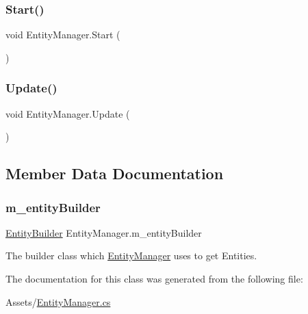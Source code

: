 \subsubsection{\texorpdfstring{Start()}{Start()}}
{\footnotesize\ttfamily void Entity\+Manager.\+Start (\begin{DoxyParamCaption}{ }\end{DoxyParamCaption})\hspace{0.3cm}{\ttfamily [private]}}

\mbox{\label{class_entity_manager_a842b748cc70c7e1366a57df0475b5b96}} 
\subsubsection{\texorpdfstring{Update()}{Update()}}
{\footnotesize\ttfamily void Entity\+Manager.\+Update (\begin{DoxyParamCaption}{ }\end{DoxyParamCaption})\hspace{0.3cm}{\ttfamily [private]}}



\subsection{Member Data Documentation}
\mbox{\label{class_entity_manager_a0a1c610cd196c0832945dfd10009b18f}} 
\subsubsection{\texorpdfstring{m\+\_\+entity\+Builder}{m\_entityBuilder}}
{\footnotesize\ttfamily \hyperlink{class_entity_builder}{Entity\+Builder} Entity\+Manager.\+m\+\_\+entity\+Builder\hspace{0.3cm}{\ttfamily [private]}}



The builder class which \hyperlink{class_entity_manager}{Entity\+Manager} uses to get Entities. 



The documentation for this class was generated from the following file\+:\begin{DoxyCompactItemize}
\item 
Assets/\hyperlink{_entity_manager_8cs}{Entity\+Manager.\+cs}\end{DoxyCompactItemize}
